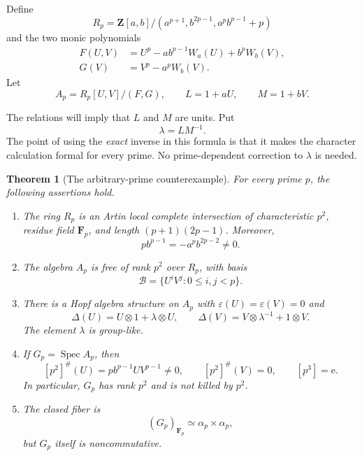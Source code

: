 \documentclass[11pt]{amsart}
\newtheorem{theorem}{Theorem}[section]
\theoremstyle{definition}
\theoremstyle{remark}
\newcommand{\Z}{\mathbf Z}
\newcommand{\F}{\mathbf F}
\newcommand{\Spec}{\operatorname{Spec}}
\newcommand{\ot}{\otimes}
\newcommand{\unit}{\mathrm e}
\begin{document}
Define
\begin{equation}\label{eq:base}
 R_p=\Z[a,b]/(a^{p+1},b^{2p-1},a^pb^{p-1}+p)
\end{equation}
and the two monic polynomials
\begin{equation}\label{eq:F-G}
 \begin{split}
 F(U,V)&=U^p-a b^{p-1}W_a(U)+b^pW_b(V),\\
 G(V)&=V^p-a^pW_b(V).
 \end{split}
\end{equation}
Let
\begin{equation}\label{eq:A}
 A_p=R_p[U,V]/(F,G),
 \qquad L=1+aU,\qquad M=1+bV.
\end{equation}

The relations will imply that \(L\) and \(M\) are units.  Put
\begin{equation}\label{eq:lambda}
 \lambda=LM^{-1}.
\end{equation}
The point of using the \emph{exact} inverse in this formula is that it
makes the character calculation formal for every prime.  No
prime-dependent correction to \(\lambda\) is needed.

\begin{theorem}[The arbitrary-prime counterexample]\label{thm:main}
For every prime \(p\), the following assertions hold.
\begin{enumerate}
\item The ring \(R_p\) is an Artin local complete intersection of
characteristic \(p^2\), residue field \(\F_p\), and length
\((p+1)(2p-1)\).  Moreover,
\[
 p b^{p-1}=-a^pb^{2p-2}\ne0.
\]
\item The algebra \(A_p\) is free of rank \(p^2\) over \(R_p\), with
basis
\[
 \mathcal B=\{U^iV^j:0\leq i,j<p\}.
\]
\item There is a Hopf algebra structure on \(A_p\) with
\(\varepsilon(U)=\varepsilon(V)=0\) and
\begin{equation}\label{eq:Delta-main}
 \Delta(U)=U\ot1+\lambda\ot U,
 \qquad
 \Delta(V)=V\ot\lambda^{-1}+1\ot V.
\end{equation}
The element \(\lambda\) is group-like.
\item If \(G_p=\Spec A_p\), then
\begin{equation}\label{eq:power-main}
 [p^2]^\#(U)=p b^{p-1}UV^{p-1}\ne0,
 \qquad
 [p^2]^\#(V)=0,
 \qquad
 [p^3]=\unit.
\end{equation}
In particular, \(G_p\) has rank \(p^2\) and is not killed by \(p^2\).
\item The closed fiber is
\[
 (G_p)_{\F_p}\simeq\alpha_p\times\alpha_p,
\]
but \(G_p\) itself is noncommutative.
\end{enumerate}
\end{theorem}
\end{document}

